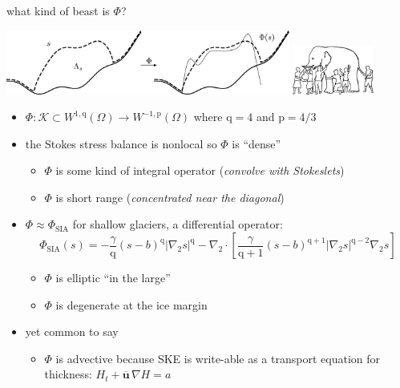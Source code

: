 \documentclass[usepdftitle=false,usenames,dvipsnames]{beamer}
\newcommand{\grad}{\nabla}
\newcommand{\bu}{\mathbf{u}}
\newcommand{\pp}{{\text{p}}}
\newcommand{\qq}{{\text{q}}}
\begin{document}
\begin{frame}{what kind of beast is $\Phi$?}

\begin{center}
\includegraphics[width=0.7\textwidth]{figs/idoaction.png} \hfill \includegraphics[width=0.2\textwidth]{figs/elephant.png}
\end{center}

\begin{itemize}
\small
\item $\Phi : \mathcal{K} \subset W^{1,\qq}(\Omega) \to W^{-1,\pp}(\Omega)$ where $\qq=4$ and $\pp=4/3$
\item the Stokes stress balance is nonlocal so $\Phi$ is ``dense''
    \begin{itemize}
    \item $\Phi$ is some kind of integral operator (\emph{convolve with Stokeslets})
    \item $\Phi$ is short range (\emph{concentrated near the diagonal})
    \end{itemize}
\item $\Phi \approx \Phi_{\text{SIA}}$ for shallow glaciers, a differential operator:
    $$\Phi_{\text{SIA}}(s) = - \frac{\gamma}{\qq} (s-b)^{\qq} |\grad_2 s|^{\qq} - \grad_2 \cdot\left[\frac{\gamma}{\qq+1} (s-b)^{\qq+1} |\grad_2 s|^{\qq-2} \grad_2 s\right]$$

    \begin{itemize}
    \item $\Phi$ is elliptic ``in the large''
    \item $\Phi$ is degenerate at the ice margin
    \end{itemize}
\item yet common to say
    \begin{itemize}
    \item $\Phi$ is advective because SKE is write-able as a transport equation for thickness: $H_t + \overline{\bu}\, \grad H = a$
    \end{itemize}
\end{itemize}
\end{frame}
\end{document}
